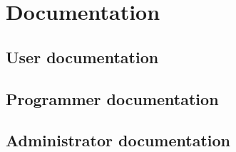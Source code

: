 \chapter{Documentation}
\section{User documentation}
\section{Programmer documentation}
\section{Administrator documentation}